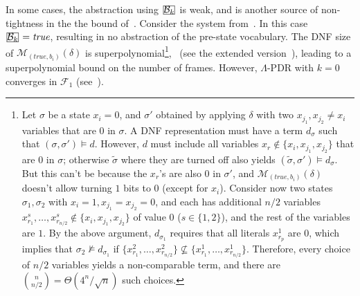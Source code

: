 \documentclass[acmsmall,screen]{acmart}
\newcommand{\true}{{\textit{true}}}
\newcommand{\tr}{\delta}
\newcommand{\Frame}{\mathcal{F}}
\newcommand{\set}[1]{\{{#1}\}}
\newcommand{\bkwrch}[1]{\mathcal{B}_{#1}}
\newcommand{\monox}[2]{\mathcal{M}_{#2}({#1})}
\newcommand{\bkcube}{b}
\newcommand\mathbox[1]{\mathord{\ThisStyle{%
  \fboxsep0\LMpt\relax\kern1\LMpt\fbox{$\SavedStyle#1$}\kern1\LMpt}}}
\newcommand{\cubejoin}[1]{\mathbox{#1}}
\begin{document}
\begin{example}
%
In some cases, the abstraction using $\cubejoin{\bkwrch{k}}$ is weak, and is another source of non-tightness in the the bound of~.
%
%
%
%
Consider the system from~.
In this case $\cubejoin{\bkwrch{k}}=\true$, resulting in no abstraction of the pre-state vocabulary. The DNF size of $\monox{\tr}{(\true,\bkcube_i)}$ is superpolynomial\iflong\footnote{
	Let $\sigma$ be a state
	$x_i=0$, and $\sigma'$ obtained by applying $\tr$ with two $x_{j_1},x_{j_2} \neq x_i$ variables that are $0$ in $\sigma$.
	A DNF representation must have a term $d_{\sigma}$ such that $(\sigma,\sigma') \models d$. However, $d$ must include all variables $x_r \not\in \set{x_i,x_{j_1},x_{j_2}}$ that are $0$ in $\sigma$; otherwise $\tilde{\sigma}$ where they are turned off also yields $(\tilde{\sigma},\sigma') \models d_{\sigma}$. But this can't be because the $x_r$'s are also $0$ in $\sigma'$, and $\monox{\tr}{(\true,\bkcube_i)}$ doesn't allow turning $1$ bits to $0$ (except for $x_i$).
	Consider now two states $\sigma_1,\sigma_2$ with $x_i=1,x_{j_1}=x_{j_2}=0$, and each has additional $n/2$ variables $x^{s}_{r_1},\ldots,x^{s}_{r_{n/2}} \not\in \set{x_i,x_{j_1},x_{j_2}}$ of value $0$ ($s \in \set{1,2}$), and the rest of the variables are $1$. By the above argument, $d_{\sigma_1}$ requires that all literals $x^{1}_{r_p}$ are $0$, which implies that $\sigma_2 \not\models d_{\sigma_1}$ if $\set{x^{2}_{r_1},\ldots,x^{2}_{r_{n/2}}} \not\subseteq \set{x^{1}_{r_1},\ldots,x^{1}_{r_{n/2}}}$.
	Therefore, every choice of $n/2$ variables yields a non-comparable term, and there are $\binom{n}{n/2} = \Theta\left(4^n/\sqrt{n}\right)$ such choices.
},
\else
~(see the extended version~\cite{extendedVersion}),
\fi
leading to a superpolynomial bound on the number of frames.
%
However, $\Lambda$-PDR with $k=0$ converges in $\Frame_1$ (see~).
\end{example}
\end{document}
